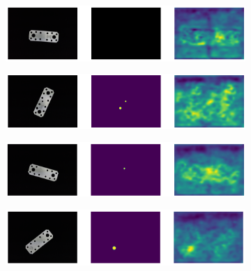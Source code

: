 \begin{figure}[htbp]
    \captionsetup[subfigure]{justification=centering}
    \centering
    \begin{subfigure}[b]{0.3\textwidth}
        \centering
        \includegraphics[width=\textwidth]{figures/ensemblehierarchyimages/image_prediction_018.png}

    \end{subfigure}
    \begin{subfigure}[b]{0.3\textwidth}
        \centering
        \includegraphics[width=\textwidth]{figures/ensemblehierarchyimages/image_prediction_021.png}


    \end{subfigure}
    \begin{subfigure}[b]{0.3\textwidth}
        \centering
        \includegraphics[width=\textwidth]{figures/ensemblehierarchyimages/image_prediction_047.png}


    \end{subfigure}
    \begin{subfigure}[b]{0.3\textwidth}
        \centering
        \includegraphics[width=\textwidth]{figures/ensemblehierarchyimages/image_prediction_064.png}


\end{subfigure}
\end{figure}
